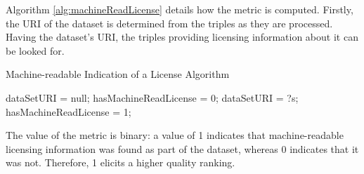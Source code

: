 Algorithm \ref{alg:machineReadLicense} details how the metric is computed. Firstly, the URI of the dataset is determined from the triples as they are processed. Having the dataset's URI, the triples providing licensing information about it can be looked for.
\begin{algorithm}
\caption{Machine-readable Indication of a License Algorithm} \label{alg:machineReadLicense}
\begin{algorithmic}[1]
\State dataSetURI = null;
\State hasMachineReadLicense = 0;
\EndProcedure
{}
\State dataSetURI = ?s;
\EndIf
{} 
\State hasMachineReadLicense = 1;
\EndIf ~\\
\EndProcedure
\end{algorithmic}
\end{algorithm}
The value of the metric is binary: a value of 1 indicates that machine-readable licensing information was found as part of the dataset, whereas 0 indicates that it was not. Therefore, 1 elicits a higher quality ranking.





